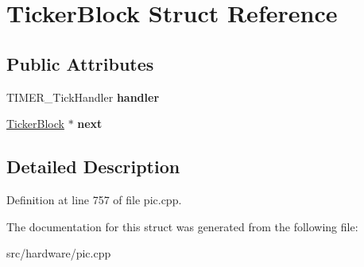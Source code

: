 \hypertarget{structTickerBlock}{\section{Ticker\-Block Struct Reference}
\label{structTickerBlock}
}
\subsection*{Public Attributes}
\begin{DoxyCompactItemize}
\item 
\hypertarget{structTickerBlock_a988263e8ab525b52670e556aece5f427}{T\-I\-M\-E\-R\-\_\-\-Tick\-Handler {\bfseries handler}}\label{structTickerBlock_a988263e8ab525b52670e556aece5f427}

\item 
\hypertarget{structTickerBlock_a291819bf28ca00f5d7c0a26d1f771e8b}{\hyperlink{structTickerBlock}{Ticker\-Block} $\ast$ {\bfseries next}}\label{structTickerBlock_a291819bf28ca00f5d7c0a26d1f771e8b}

\end{DoxyCompactItemize}


\subsection{Detailed Description}


Definition at line 757 of file pic.\-cpp.



The documentation for this struct was generated from the following file\-:\begin{DoxyCompactItemize}
\item 
src/hardware/pic.\-cpp\end{DoxyCompactItemize}
